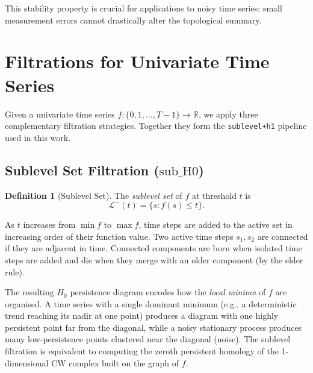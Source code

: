 \documentclass[12pt, a4paper]{article}
\theoremstyle{definition}
\newtheorem{definition}{Definition}[section]
\theoremstyle{plain}
\newcommand{\R}{\mathbb{R}}
\begin{document}
This stability property is crucial for applications to noisy time series: small
measurement errors cannot drastically alter the topological summary.

\section{Filtrations for Univariate Time Series}
\label{sec:filtrations}

Given a univariate time series $f : \{0, 1, \ldots, T-1\} \to \R$, we apply
three complementary filtration strategies. Together they form the
\texttt{sublevel+h1} pipeline used in this work.

\subsection{Sublevel Set Filtration ($\text{sub\_H0}$)}

\begin{definition}[Sublevel Set]
The \emph{sublevel set} of $f$ at threshold $t$ is
\[
  \mathcal{L}^-(t) = \{s : f(s) \leq t\}.
\]
\end{definition}

As $t$ increases from $\min f$ to $\max f$, time steps are added to the active
set in increasing order of their function value. Two active time steps $s_1, s_2$
are connected if they are adjacent in time. Connected components are born when
isolated time steps are added and die when they merge with an older component (by
the elder rule).

The resulting $H_0$ persistence diagram encodes how the \emph{local minima} of
$f$ are organised. A time series with a single dominant minimum (e.g., a
deterministic trend reaching its nadir at one point) produces a diagram with one
highly persistent point far from the diagonal, while a noisy stationary process
produces many low-persistence points clustered near the diagonal (noise). The
sublevel filtration is equivalent to computing the zeroth persistent homology of
the 1-dimensional CW complex built on the graph of $f$.
\end{document}
